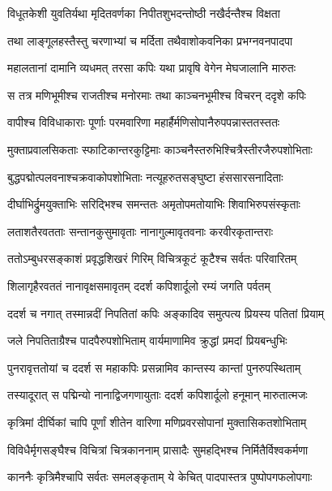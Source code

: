 \twolineshloka
{विधूतकेशी युवतिर्यथा मृदितवर्णका}
{निपीतशुभदन्तोष्ठी नखैर्दन्तैश्च विक्षता} %

\twolineshloka
{तथा लाङ्गूलहस्तैस्तु चरणाभ्यां च मर्दिता}
{तथैवाशोकवनिका प्रभग्नवनपादपा} %

\twolineshloka
{महालतानां दामानि व्यधमत् तरसा कपिः}
{यथा प्रावृषि वेगेन मेघजालानि मारुतः} %

\twolineshloka
{स तत्र मणिभूमीश्च राजतीश्च मनोरमाः}
{तथा काञ्चनभूमीश्च विचरन् ददृशे कपिः} %

\twolineshloka
{वापीश्च विविधाकाराः पूर्णाः परमवारिणा}
{महार्हैर्मणिसोपानैरुपपन्नास्ततस्ततः} %

\twolineshloka
{मुक्ताप्रवालसिकताः स्फाटिकान्तरकुट्टिमाः}
{काञ्चनैस्तरुभिश्चित्रैस्तीरजैरुपशोभिताः} %

\twolineshloka
{बुद्धपद्मोत्पलवनाश्चक्रवाकोपशोभिताः}
{नत्यूहरुतसङ्घुष्टा हंससारसनादिताः} %

\twolineshloka
{दीर्घाभिर्द्रुमयुक्ताभिः सरिद्भिश्च समन्ततः}
{अमृतोपमतोयाभिः शिवाभिरुपसंस्कृताः} %

\twolineshloka
{लताशतैरवतताः सन्तानकुसुमावृताः}
{नानागुल्मावृतवनाः करवीरकृतान्तराः} %

\twolineshloka
{ततोऽम्बुधरसङ्काशं प्रवृद्धशिखरं गिरिम्}
{विचित्रकूटं कूटैश्च सर्वतः परिवारितम्} %

\twolineshloka
{शिलागृहैरवततं नानावृक्षसमावृतम्}
{ददर्श कपिशार्दूलो रम्यं जगति पर्वतम्} %

\twolineshloka
{ददर्श च नगात् तस्मान्नदीं निपतितां कपिः}
{अङ्कादिव समुत्पत्य प्रियस्य पतितां प्रियाम्} %

\twolineshloka
{जले निपतिताग्रैश्च पादपैरुपशोभिताम्}
{वार्यमाणामिव क्रुद्धां प्रमदां प्रियबन्धुभिः} %

\twolineshloka
{पुनरावृत्ततोयां च ददर्श स महाकपिः}
{प्रसन्नामिव कान्तस्य कान्तां पुनरुपस्थिताम्} %

\twolineshloka
{तस्यादूरात् स पद्मिन्यो नानाद्विजगणायुताः}
{ददर्श कपिशार्दूलो हनूमान् मारुतात्मजः} %

\twolineshloka
{कृत्रिमां दीर्घिकां चापि पूर्णां शीतेन वारिणा}
{मणिप्रवरसोपानां मुक्तासिकतशोभिताम्} %

\twolineshloka
{विविधैर्मृगसङ्घैश्च विचित्रां चित्रकाननाम्}
{प्रासादैः सुमहद्भिश्च निर्मितैर्विश्वकर्मणा} %

\twolineshloka
{काननैः कृत्रिमैश्चापि सर्वतः समलङ्कृताम्}
{ये केचित् पादपास्तत्र पुष्पोपगफलोपगाः} %

